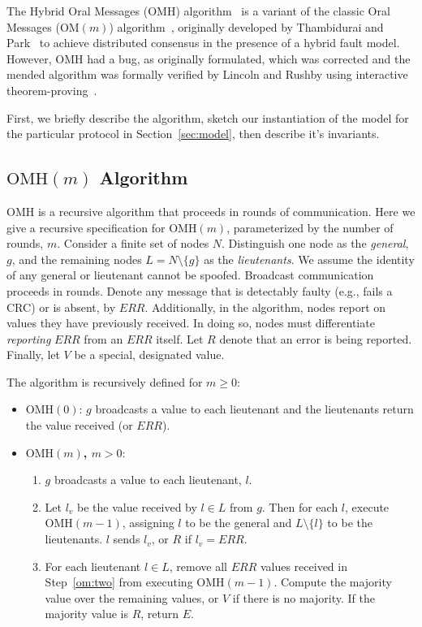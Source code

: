 \documentclass{llncs/llncs}
\newcommand{\OM}[1]{\ensuremath{\mathrm{OM}(#1)}\xspace}
\newcommand{\OMH}{\ensuremath{\mathrm{OMH}}\xspace}
\newcommand{\ERR}{\ensuremath{\mathit{ERR}}\xspace}
\begin{document}
The Hybrid Oral Messages ($\OMH$) algorithm~\cite{Lincoln-Rushby} is a variant of the classic Oral Messages ($\OM{m}$) algorithm~\cite{om}, originally developed by Thambidurai and Park~\cite{hybrid} to achieve distributed consensus in the presence of a hybrid fault model. However, $\OMH$ had a bug, as originally formulated, which was corrected and the mended algorithm was formally verified by Lincoln and Rushby using interactive theorem-proving~\cite{Lincoln-Rushby}.

First, we briefly describe the algorithm, sketch our instantiation of the model for the particular protocol in Section~\ref{sec:model}, then describe it's invariants.


\subsection{$\OMH(m)$ Algorithm}
$\OMH$ is a recursive algorithm that proceeds in rounds of communication. Here we give a recursive specification for $\OMH(m)$, parameterized by the number of rounds, $m$. Consider a finite set of nodes $N$. Distinguish one node as the \emph{general}, $g$, and the remaining nodes $L = N \setminus \{g\}$ as the \emph{lieutenants}. We assume the identity of any general or lieutenant cannot be spoofed. Broadcast communication proceeds in rounds. Denote any message that is detectably faulty (e.g., fails a CRC) or is absent, by $\ERR$. Additionally, in the algorithm, nodes report on values they have previously received. In doing so, nodes must differentiate \emph{reporting} $\ERR$ from an $\ERR$ itself. Let $R$ denote that an error is being reported. Finally, let $V$ be a special, designated value.

The algorithm is recursively defined for $m \ge 0$:

\begin{itemize}
\item {\bf $\OMH(0)$}: $g$ broadcasts a value to each lieutenant and the lieutenants return the value received (or $\ERR$).
\item {\bf $\OMH(m)$, $m > 0$}:
  \begin{enumerate}
  \item $g$ broadcasts a value to each lieutenant, $l$.
  \item\label{om:two} Let $l_v$ be the value received by $l \in L$ from $g$. Then for each $l$, execute $\OMH(m-1)$, assigning $l$ to be the general and $L \setminus \{l\}$ to be the lieutenants. $l$ sends $l_v$, or $R$ if $l_v = \ERR$.
  \item\label{om:three} For each lieutenant $l \in L$, remove all $\ERR$ values received in Step~\ref{om:two} from executing $\OMH(m-1)$. Compute the majority value over the remaining values, or $V$ if there is no majority. If the majority value is $R$, return $E$.
  \end{enumerate}
\end{itemize}
\end{document}
